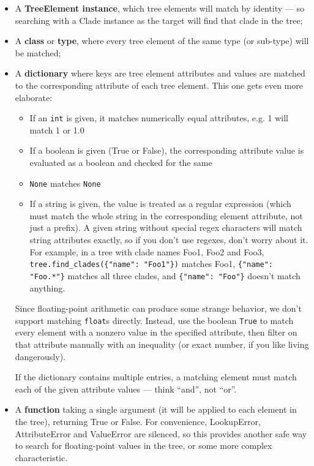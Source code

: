 \documentclass{report}
\begin{document}
\begin{itemize}
  \item A \textbf{TreeElement instance}, which tree elements will match by identity --- so
    searching with a Clade instance as the target will find that clade in the tree;

  \item A \textbf{class} or \textbf{type}, where every tree element of the same type (or
    sub-type) will be matched;

  \item A \textbf{dictionary} where keys are tree element attributes and values are matched to the
    corresponding attribute of each tree element. This one gets even more elaborate:

    \begin{itemize}
      \item If an \texttt{int} is given, it matches numerically equal attributes, e.g. 1 will
        match 1 or 1.0

      \item If a boolean is given (True or False), the corresponding attribute value is
        evaluated as a boolean and checked for the same

      \item \texttt{None} matches \texttt{None}

      \item If a string is given, the value is treated as a regular expression (which must
        match the whole string in the corresponding element attribute, not just a prefix).  A
        given string without special regex characters will match string attributes exactly, so
        if you don't use regexes, don't worry about it.  For example, in a tree with clade
        names Foo1, Foo2 and Foo3, \verb|tree.find_clades({"name": "Foo1"})| matches Foo1,
        \verb|{"name": "Foo.*"}| matches all three clades, and \verb|{"name": "Foo"}| doesn't
        match anything.

    \end{itemize}

    Since floating-point arithmetic can produce some strange behavior, we don't support
    matching \texttt{float}s directly. Instead, use the boolean \texttt{True} to match every
    element with a nonzero value in the specified attribute, then filter on that attribute
    manually with an inequality (or exact number, if you like living dangerously).

    If the dictionary contains multiple entries, a matching element must match each of the
    given attribute values --- think ``and'', not ``or''.

  \item A \textbf{function} taking a single argument (it will be applied to each element in the
    tree), returning True or False. For convenience, LookupError, AttributeError and ValueError
    are silenced, so this provides another safe way to search for floating-point values in the
    tree, or some more complex characteristic.

\end{itemize}
\end{document}
